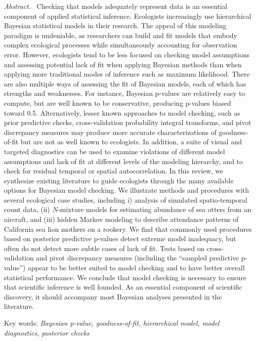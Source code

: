 \documentclass[12pt,english]{article}
\begin{document}
\begin{spacing}{1.9}
{\em Abstract.\ } Checking that models adequately represent data is an
essential component of applied statistical inference.  Ecologists
increasingly use hierarchical Bayesian statistical models in their
research.  The appeal of this modeling paradigm is undeniable, as
researchers can build and fit models that embody complex ecological
processes while simultaneously accounting for observation
error. However, ecologists tend to be less focused on checking model
assumptions and assessing potential lack of fit when applying Bayesian
methods than when applying more traditional modes of inference such as
maximum likelihood.  There are also multiple ways of assessing the fit
of Bayesian models, each of which has strengths and weaknesses.  For
instance, Bayesian p-values are relatively easy to compute, but are
well known to be conservative, producing p-values biased toward 0.5.
Alternatively, lesser known approaches to model checking, such as
prior predictive checks, cross-validation probability integral
transforms, and pivot discrepancy measures may produce more accurate
characterizations of goodness-of-fit but are not as well known to
ecologists.  In addition, a suite of visual and targeted diagnostics
can be used to examine violations of different model assumptions and
lack of fit at different levels of the modeling hierarchy, and to
check for residual temporal or spatial autocorrelation.  In this
review, we synthesize existing literature to guide ecologists through
the many available options for Bayesian model checking.  We illustrate
methods and procedures with several ecological case studies, including
i) analysis of simulated spatio-temporal count data, (ii) $N$-mixture
models for estimating abundance of sea
otters from an aircraft, and (iii) hidden Markov modeling to describe
attendance patterns of California sea lion mothers on a rookery.  We
find that commonly used procedures based on posterior predictive
p-values detect extreme model inadequacy, but often do not detect more
subtle cases of lack of fit.  Tests based on cross-validation and
pivot discrepancy measures (including the ``sampled predictive
p-value'') appear to be better suited to model checking and to have
better overall statistical performance. We conclude that model
checking is necessary to ensure that scientific inference is well founded.
As an essential component of scientific discovery, it should
accompany most Bayesian analyses presented in the literature.


{Key words: \em Bayesian p-value, goodness-of-fit, hierarchical model,
  model diagnostics, posterior checks}




\end{spacing}
\end{document}
